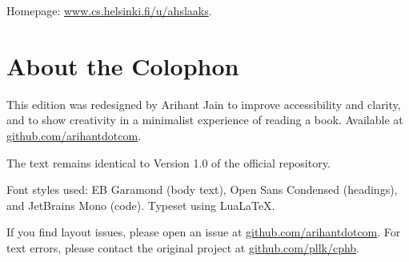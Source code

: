 \documentclass[twoside,10pt,english]{book}
\begin{document}
Homepage:
\href{https://www.cs.helsinki.fi/u/ahslaaks/}{www.cs.helsinki.fi/u/ahslaaks}.

\cleardoublepage
{}
{}
\chapter*{About the Colophon}

This edition was redesigned by Arihant Jain to improve accessibility and
clarity, and to show creativity in a minimalist experience of reading a book.
Available at \href{https://github.com/arihantdotcom}{github.com/arihantdotcom}.

The text remains identical to Version 1.0 of the official repository.

Font styles used: EB Garamond (body text), Open Sans Condensed (headings), and
JetBrains Mono (code). Typeset using Lua\LaTeX.

If you find layout issues, please open an issue at
\href{https://github.com/arihantdotcom}{github.com/arihantdotcom}. For text
errors, please contact the original project at
\href{https://github.com/pllk/cphb/}{github.com/pllk/cphb}.
\end{document}
